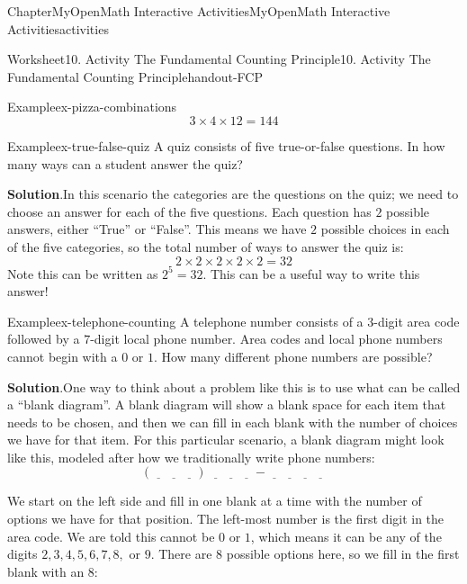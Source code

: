\documentclass[oneside,10pt,]{book}
\newcommand{\blocktitlefont}{\relax}
\begin{document}
\begin{chapterptx}{Chapter}{MyOpenMath Interactive Activities}{}{MyOpenMath Interactive Activities}{}{}{activities}
\begin{worksheet-section}{Worksheet}{10. Activity The Fundamental Counting Principle}{}{10. Activity The Fundamental Counting Principle}{}{}{handout-FCP}
\begin{example}{Example}{}{ex-pizza-combinations}
\begin{equation*}
3 \times 4 \times 12 = 144
\end{equation*}
%
\end{example}
\begin{example}{Example}{}{ex-true-false-quiz}%
A quiz consists of five true-or-false questions. In how many ways can a student answer the quiz?%
\par\smallskip%
\noindent\textbf{\blocktitlefont Solution}.\hypertarget{ex-true-false-quiz-2}{}\quad{}In this scenario the categories are the questions on the quiz; we need to choose an answer for each of the five questions. Each question has \(2\) possible answers, either \textquotedblleft{}True\textquotedblright{} or \textquotedblleft{}False\textquotedblright{}. This means we have \(2\) possible choices in each of the five categories, so the total number of ways to answer the quiz is:%
\begin{equation*}
2 \times 2 \times 2 \times 2 \times 2 = 32
\end{equation*}
Note this can be written as \(2^5 = 32\). This can be a useful way to write this answer!%
\end{example}
\begin{example}{Example}{}{ex-telephone-counting}%
A telephone number consists of a \(3\)-digit area code followed by a \(7\)-digit local phone number. Area codes and local phone numbers cannot begin with a \(0\) or \(1\). How many different phone numbers are possible?%
\par\smallskip%
\noindent\textbf{\blocktitlefont Solution}.\hypertarget{ex-telephone-counting-2}{}\quad{}One way to think about a problem like this is to use what can be called a \textquotedblleft{}blank diagram\textquotedblright{}. A blank diagram will show a blank space for each item that needs to be chosen, and then we can fill in each blank with the number of choices we have for that item. For this particular scenario, a blank diagram might look like this, modeled after how we traditionally write phone numbers:%
\begin{equation*}
(\underline{\quad} \ \underline{\quad} \ \underline{\quad}) \ \underline{\quad} \ \underline{\quad} \ \underline{\quad} - \underline{\quad} \ \underline{\quad} \ \underline{\quad} \ \underline{\quad}
\end{equation*}
%
\par
We start on the left side and fill in one blank at a time with the number of options we have for that position. The left-most number is the first digit in the area code. We are told this cannot be \(0\) or \(1\), which means it can be any of the digits \(2, 3, 4, 5, 6, 7, 8,\) or \(9\). There are \(8\) possible options here, so we fill in the first blank with an \(8\):%

\end{example}
\end{worksheet-section}
\end{chapterptx}
\end{document}
